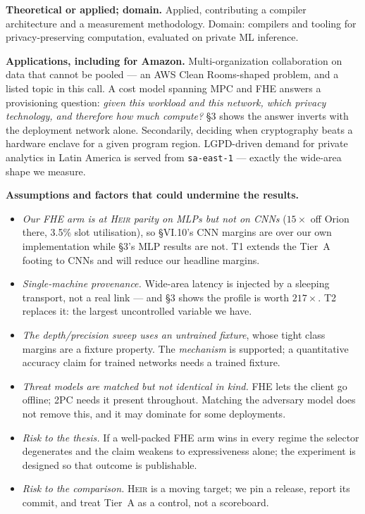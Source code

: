 \documentclass[10pt]{article}
\newcommand{\heir}{\textsc{Heir}}
\begin{document}
\noindent\textbf{Theoretical or applied; domain.} Applied, contributing a
compiler architecture and a measurement methodology. Domain: compilers and
tooling for privacy-preserving computation, evaluated on private ML inference.

\noindent\textbf{Applications, including for Amazon.} Multi-organization
collaboration on data that cannot be pooled --- an AWS Clean Rooms-shaped
problem, and a listed topic in this call. A cost model spanning MPC and FHE
answers a provisioning question: \emph{given this workload and this network,
which privacy technology, and therefore how much compute?} §3 shows the answer
inverts with the deployment network alone. Secondarily, deciding when
cryptography beats a hardware enclave for a given program region. LGPD-driven
demand for private analytics in Latin America is served from
\texttt{sa-east-1} --- exactly the wide-area shape we measure.

\noindent\textbf{Assumptions and factors that could undermine the results.}
\begin{itemize}
\item \emph{Our FHE arm is at \heir{} parity on MLPs but not on CNNs}
($15\times$ off Orion there, 3.5\% slot utilisation), so §VI.10's CNN margins
are over our own implementation while §3's MLP results are not. T1 extends the
Tier~A footing to CNNs and will reduce our headline margins.
\item \emph{Single-machine provenance.} Wide-area latency is injected by a
sleeping transport, not a real link --- and §3 shows the profile is worth
$217\times$. T2 replaces it: the largest uncontrolled variable we have.
\item \emph{The depth/precision sweep uses an untrained fixture}, whose tight
class margins are a fixture property. The \emph{mechanism} is supported; a
quantitative accuracy claim for trained networks needs a trained fixture.
\item \emph{Threat models are matched but not identical in kind.} FHE lets the
client go offline; 2PC needs it present throughout. Matching the adversary model
does not remove this, and it may dominate for some deployments.
\item \emph{Risk to the thesis.} If a well-packed FHE arm wins in every regime
the selector degenerates and the claim weakens to expressiveness alone; the
experiment is designed so that outcome is publishable.
\item \emph{Risk to the comparison.} \heir{} is a moving target; we pin a
release, report its commit, and treat Tier~A as a control, not a scoreboard.
\end{itemize}
\end{document}
